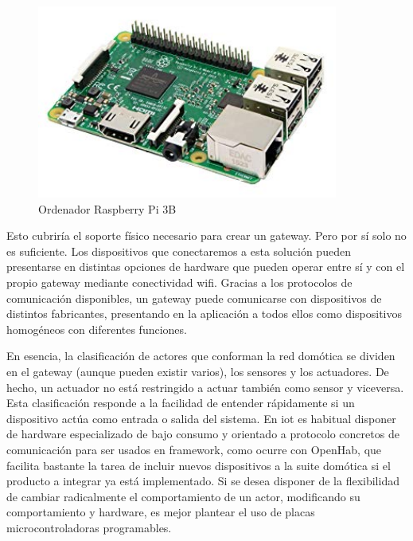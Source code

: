 \begin{figure}[hbt!]
\centering
\includegraphics[height=2.5in]{figures/raspberrypi3b.jpg}
\caption[captura de una Raspberry]{Ordenador Raspberry Pi 3B\footnotemark}
\end{figure}

\vspace{1cm}


Esto cubriría el soporte físico necesario para crear un \gls{gateway}. Pero por sí solo no es suficiente. Los dispositivos que conectaremos a esta solución pueden presentarse en distintas opciones de hardware que pueden operar entre sí y con el propio \gls{gateway} mediante conectividad \gls{wifi}. Gracias a los protocolos de comunicación disponibles, un \gls{gateway} puede comunicarse con dispositivos de distintos fabricantes, presentando en la aplicación a todos ellos como dispositivos homogéneos con diferentes funciones.

\vspace{1cm}

En esencia, la clasificación de actores que conforman la red domótica se dividen en el \gls{gateway} (aunque pueden existir varios), los sensores y los actuadores. De hecho, un actuador no está restringido a actuar también como sensor y viceversa. Esta clasificación responde a la facilidad de entender rápidamente si un dispositivo actúa como entrada o salida del sistema. En \gls{iot} es habitual disponer de hardware especializado de bajo consumo y orientado a protocolo concretos de comunicación para ser usados en \gls{framework}, como ocurre con OpenHab, que facilita bastante la tarea de incluir nuevos dispositivos a la suite domótica si el producto a integrar ya está implementado. Si se desea disponer de la flexibilidad de cambiar radicalmente el comportamiento de un actor, modificando su comportamiento y hardware, es mejor plantear el uso de placas microcontroladoras programables.


